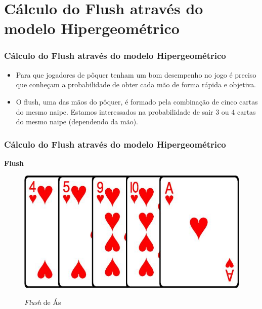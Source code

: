 \documentclass{beamer}
\begin{document}
\section{Cálculo do Flush através do modelo Hipergeométrico}
\begin{frame}
\frametitle{Cálculo do Flush através do modelo Hipergeométrico} 
\begin{itemize}
	
\item Para que jogadores de pôquer tenham um bom desempenho no jogo é preciso que conheçam a probabilidade de obter cada mão de forma rápida e objetiva.

\item O flush, uma das mãos do pôquer, é formado pela combinação de cinco cartas do mesmo naipe. Estamos interessados na probabilidade de sair 3 ou 4 cartas do mesmo naipe (dependendo da mão).
\end{itemize}
\end{frame}

\begin{frame}
\frametitle{Cálculo do Flush através do modelo Hipergeométrico} 
\begin{center}
	{\Large \textbf{Flush}}
\end{center}

\begin{figure}[h]
	\centering
	\includegraphics[scale=.4]{flush}
	\label{rakingmaos}
	\caption{\textit{Flush} de Ás}
\end{figure}
\end{frame}
\end{document}
